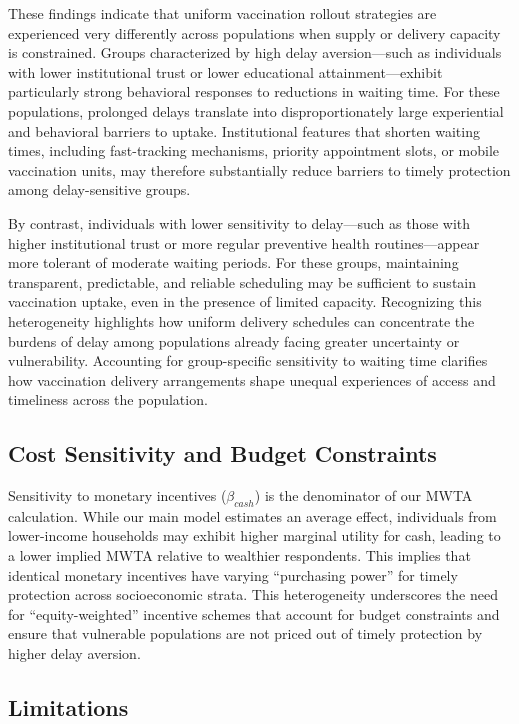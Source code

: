 \documentclass[preprint,12pt]{elsarticle}
\begin{document}
These findings indicate that uniform vaccination rollout strategies are experienced very
differently across populations when supply or delivery capacity is constrained. Groups
characterized by high delay aversion—such as individuals with lower institutional trust or
lower educational attainment—exhibit particularly strong behavioral responses to reductions
in waiting time. For these populations, prolonged delays translate into disproportionately
large experiential and behavioral barriers to uptake. Institutional features that shorten
waiting times, including fast-tracking mechanisms, priority appointment slots, or mobile
vaccination units, may therefore substantially reduce barriers to timely protection among
delay-sensitive groups.

By contrast, individuals with lower sensitivity to delay—such as those with higher
institutional trust or more regular preventive health routines—appear more tolerant of
moderate waiting periods. For these groups, maintaining transparent, predictable, and
reliable scheduling may be sufficient to sustain vaccination uptake, even in the presence
of limited capacity. Recognizing this heterogeneity highlights how uniform delivery
schedules can concentrate the burdens of delay among populations already facing greater
uncertainty or vulnerability. Accounting for group-specific sensitivity to waiting time
clarifies how vaccination delivery arrangements shape unequal experiences of access and
timeliness across the population.

\subsection{Cost Sensitivity and Budget Constraints}

Sensitivity to monetary incentives ($\beta_{cash}$) is the denominator of our MWTA 
calculation. While our main model estimates an average effect, individuals from lower-income 
households may exhibit higher marginal utility for cash, leading to a lower implied MWTA 
relative to wealthier respondents. This implies that identical monetary incentives have 
varying ``purchasing power'' for timely protection across socioeconomic strata. This 
heterogeneity underscores the need for ``equity-weighted'' incentive schemes that account for 
budget constraints and ensure that vulnerable populations are not priced out of timely 
protection by higher delay aversion.

\subsection{Limitations}
\end{document}
